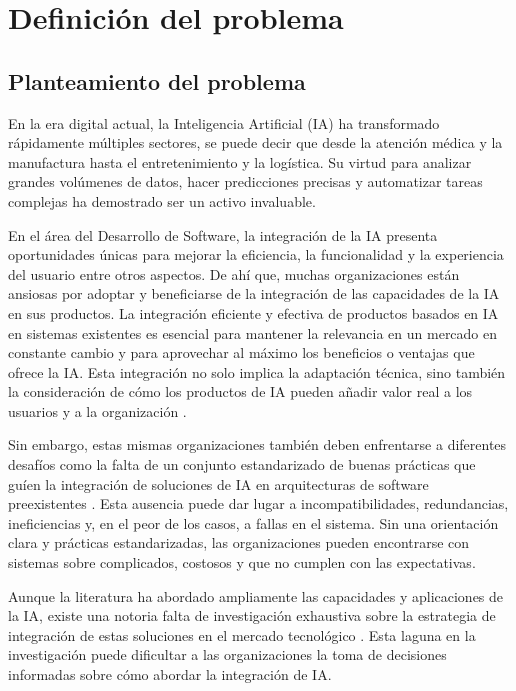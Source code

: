 \section{Definición del problema}

\subsection{Planteamiento del problema}
En la era digital actual, la Inteligencia Artificial (IA) ha transformado rápidamente múltiples sectores, se puede decir que desde la atención médica y la manufactura hasta el entretenimiento y la logística. Su virtud para analizar grandes volúmenes de datos, hacer predicciones precisas y automatizar tareas complejas ha demostrado ser un activo invaluable. 

En el \'area del Desarrollo de Software, la integración de la IA presenta oportunidades únicas para mejorar la eficiencia, la funcionalidad y la experiencia del usuario entre otros aspectos. De ah\'i que, muchas organizaciones están ansiosas por adoptar y beneficiarse de la integraci\'on de las capacidades de la IA en sus productos. La integración eficiente y efectiva de productos basados en IA en sistemas existentes es esencial para mantener la relevancia en un mercado en constante cambio y para aprovechar al máximo los beneficios o ventajas que ofrece la IA. Esta integración no solo implica la adaptación técnica, sino también la consideración de cómo los productos de IA pueden añadir valor real a los usuarios y a la organización \citep{Cui2022ConstructionIntelligence}. 

Sin embargo, estas mismas organizaciones tambi\'en deben enfrentarse a diferentes desafíos como la falta de un conjunto estandarizado de buenas prácticas que gu\'ien la integraci\'on de soluciones de IA en arquitecturas de software preexistentes \citep{Wang2016ImplementingOutlook}. Esta ausencia puede dar lugar a incompatibilidades, redundancias, ineficiencias y, en el peor de los casos, a fallas en el sistema. Sin una orientación clara y prácticas estandarizadas, las organizaciones pueden encontrarse con sistemas sobre complicados, costosos y que no cumplen con las expectativas. 

Aunque la literatura ha abordado ampliamente las capacidades y aplicaciones de la IA, existe una notoria falta de investigación exhaustiva sobre la estrategia de integración de estas soluciones en el mercado tecnológico \citep{Cui2022ConstructionIntelligence}. Esta laguna en la investigación puede dificultar a las organizaciones la toma de decisiones informadas sobre cómo abordar la integración de IA.

